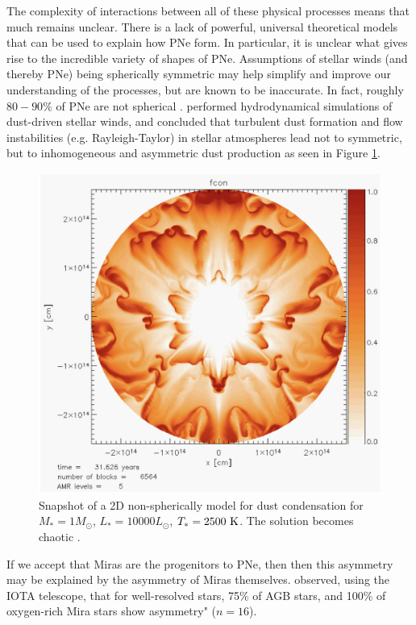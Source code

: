 \documentclass[twocolumn]{aastex63}
\begin{document}
The complexity of interactions between all of these physical processes means that much remains unclear. There is a lack of powerful, universal theoretical models that can be used to explain how PNe form. In particular, it is unclear what gives rise to the incredible variety of shapes of PNe. Assumptions of stellar winds (and thereby PNe) being spherically symmetric may help simplify and improve our understanding of the processes, but are known to be inaccurate. In fact, roughly $80-90\%$ of PNe are not spherical \citep{demarco, soker1997}. \cite{woitke} performed hydrodynamical simulations of dust-driven stellar winds, and concluded that turbulent dust formation and flow instabilities (e.g. Rayleigh-Taylor) in stellar atmospheres lead not to symmetric, but to inhomogeneous and asymmetric dust production as seen in Figure \ref{fig:dust_condensation}.
\begin{figure}[!ht]
    \includegraphics[width=\textwidth]{dust_condensation.png}
    \caption{Snapshot of a 2D non-spherically model for dust condensation for $M_* = 1M_\odot$, $L_* = 10000L_\odot$, $T_* = 2500~{\rm K}$. The solution becomes chaotic \citep{woitke}.}
    \label{fig:dust_condensation}
\end{figure}

If we accept that Miras are the progenitors to PNe, then then this asymmetry may be explained by the asymmetry of Miras themselves. \cite{ragland} observed, using the IOTA telescope, that for well-resolved stars, 75\% of AGB stars, and 100\% of oxygen-rich Mira stars show asymmetry" ($n=16$).
\end{document}
